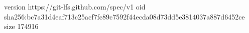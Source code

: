version https://git-lfs.github.com/spec/v1
oid sha256:bc7a31d4eaf713c25acf7fc89c7592f44ecda08d73dd5e3814037a887d6452ce
size 174916
